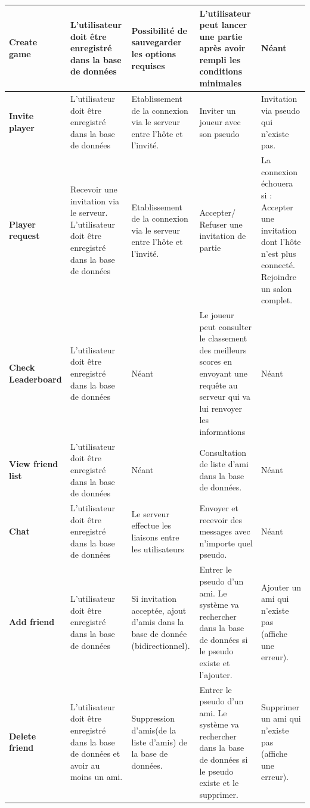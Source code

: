 \documentclass[a4paper,12pt]{article}
\begin{document}
\begin{center}
\begin{longtable}{|p{}||p{}|p{}|p{}|p{}|}
\hline
\hline
\textbf{Create game}    & L'utilisateur doit être enregistré dans la base de données  & Possibilité de sauvegarder les options requises  & L'utilisateur peut lancer une partie après avoir rempli les conditions minimales  & Néant \\
\hline
\hline
\textbf{Invite player} & L'utilisateur doit être enregistré dans la base de données   & Etablissement de la connexion via le serveur entre l’hôte et l’invité. & Inviter un joueur avec son pseudo & Invitation via pseudo qui n’existe pas. \\
\hline
\hline
\textbf{Player request}  & Recevoir une invitation via le serveur.
L'utilisateur doit être enregistré dans la base de données   & Etablissement de la connexion via le serveur entre l’hôte et l’invité.  & Accepter/ Refuser une invitation de partie  & La connexion échouera si :
Accepter une invitation dont l'hôte n’est plus connecté.
Rejoindre un salon complet. \\
\hline
\hline
\textbf{Check Leaderboard}  & L'utilisateur doit être enregistré dans la base de données   & \hfill Néant  \hfill\null &Le joueur peut consulter le classement des meilleurs scores en envoyant une requête au serveur qui va lui renvoyer les informations  & Néant \\
\hline
\hline
\textbf{View friend list }   & L'utilisateur doit être enregistré dans la base de données   & Néant  & Consultation de liste d'ami dans la base de données. & Néant \\
\hline
\hline
\textbf{Chat}     & L'utilisateur doit être enregistré dans la base de données   & Le serveur effectue les liaisons entre les utilisateurs  & Envoyer et recevoir des messages avec n'importe quel pseudo.  & Néant \\
\hline
\hline
\textbf{Add friend}    & L'utilisateur doit être enregistré dans la base de données   & Si invitation acceptée, ajout d'amis dans la base de donnée (bidirectionnel).  & Entrer le pseudo d’un ami. Le système va rechercher dans la base de données si le pseudo existe et l’ajouter.  & Ajouter un ami qui n’existe pas (affiche une erreur).\\
\hline
\hline
\textbf{Delete friend}    & L'utilisateur doit être enregistré dans la base de données et avoir au moins un ami.   & Suppression d’amis(de la liste d’amis) de la base de données.  & Entrer le pseudo d’un ami. Le système va rechercher dans la base de données si le pseudo existe et le supprimer.  & Supprimer un ami qui n’existe pas (affiche une erreur). \\

\end{longtable}
\end{center}
\end{document}
